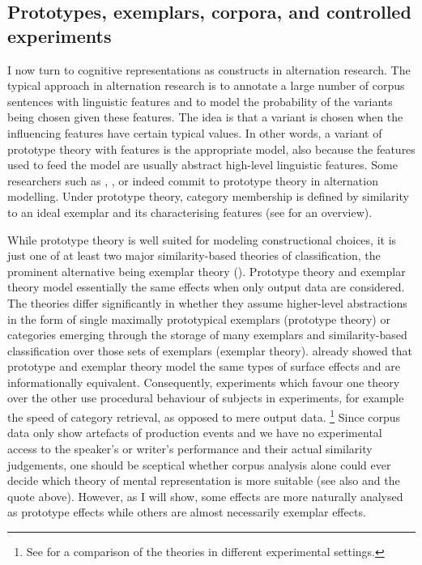 \subsection{Prototypes, exemplars, corpora, and controlled experiments}
\label{sec:prototypesexemplarscorporaandcontrolledexperiments}

I now turn to cognitive representations as constructs in alternation research.
The typical approach in alternation research is to annotate a large number of corpus sentences with linguistic features and to model the probability of the variants being chosen given these features.
The idea is that a variant is chosen when the influencing features have certain typical values.
In other words, a variant of prototype theory with features \citep{Rosch1978} is the appropriate model, also because the features used to feed the model are usually abstract high-level linguistic features. 
Some researchers such as \cite{Gries2003}, \cite{NessetJanda2010}, or \cite{Schaefer2016c} indeed commit to prototype theory in alternation modelling.
Under prototype theory, category membership is defined by similarity to an ideal exemplar and its characterising features (see \citealp{Taylor2008} for an overview).

While prototype theory is well suited for modeling constructional choices, it is just one of at least two major similarity-based theories of classification, the prominent alternative being exemplar theory (\citealp{MedinSchaffer1978,Hintzman1986}).
Prototype theory and exemplar theory model essentially the same effects when only output data are considered.
The theories differ significantly in whether they assume higher-level abstractions in the form of single maximally prototypical exemplars (prototype theory) or categories emerging through the storage of many exemplars and similarity-based classification over those sets of exemplars (exemplar theory).
\cite{Barsalou1990} already showed that prototype and exemplar theory model the same types of surface effects and are informationally equivalent.
Consequently, experiments which favour one theory over the other use procedural behaviour of subjects in experiments, for example the speed of category retrieval, as opposed to mere output data.%
\footnote{See \citet{StormsEa2000} for a comparison of the theories in different experimental settings.}
Since corpus data only show artefacts of production events and we have no experimental access to the speaker's or writer's performance and their actual similarity judgements, one should be sceptical whether corpus analysis alone could ever decide which theory of mental representation is more suitable (see also \citealp[22]{Gries2003} and the \citealp[486--487]{Dabrowska2016} quote above).
However, as I will show, some effects are more naturally analysed as prototype effects while others are almost necessarily exemplar effects.

